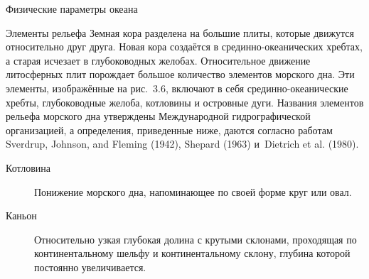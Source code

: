 \begin{chapter}{Физические параметры океана}
\begin{section}{Элементы рельефа}
Земная кора разделена на большие плиты, которые движутся относительно
друг друга. Новая кора создаётся в срединно-океанических хребтах, а
старая исчезает в глубоководных желобах. Относительное движение
литосферных плит порождает большое количество элементов морского
дна. Эти элементы, изображённые на рис.~3.6, включают в себя
срединно-океанические хребты, глубоководные желоба, котловины и островные дуги.
Названия элементов рельефа морского дна утверждены Международной
гидрографической организацией, а определения, приведенные ниже, даются 
согласно работам Sverdrup, Johnson, and Fleming (1942), Shepard (1963)
и~Dietrich et al. (1980).
%


\begin{description}
\item[Котловина] 
Понижение морского дна, напоминающее по своей форме круг или овал.
%

\item[Каньон]
Относительно узкая глубокая долина с крутыми склонами, проходящая по
континентальному шельфу и континентальному склону, глубина
которой постоянно увеличивается.
%


\end{description}
\end{section}
\end{chapter}
